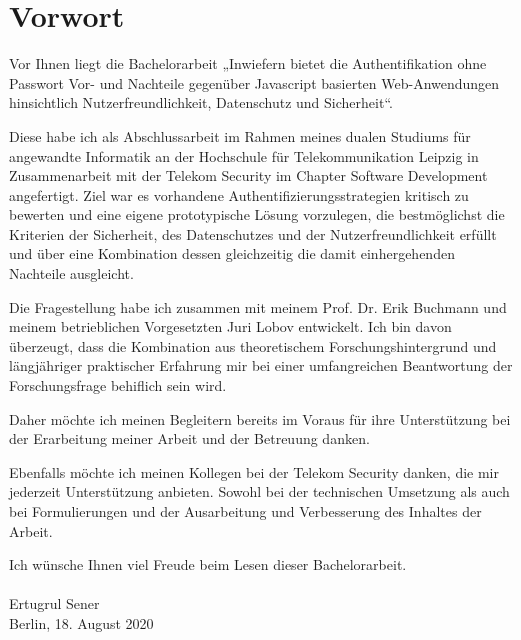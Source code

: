 \chapter{Vorwort}
Vor Ihnen liegt die Bachelorarbeit „Inwiefern bietet die Authentifikation ohne Passwort Vor- und Nachteile gegenüber Javascript basierten Web-Anwendungen hinsichtlich Nutzerfreundlichkeit, Datenschutz und Sicherheit“.

Diese habe ich als Abschlussarbeit im Rahmen meines dualen Studiums für angewandte Informatik an der Hochschule für Telekommunikation Leipzig in Zusammenarbeit mit der Telekom Security im Chapter Software Development angefertigt. Ziel war es vorhandene Authentifizierungsstrategien kritisch zu bewerten und eine eigene prototypische Lösung vorzulegen, die bestmöglichst die Kriterien der Sicherheit, des Datenschutzes und der Nutzerfreundlichkeit erfüllt und über eine Kombination dessen gleichzeitig die damit einhergehenden Nachteile ausgleicht.

Die Fragestellung habe ich zusammen mit meinem Prof. Dr. Erik Buchmann und meinem betrieblichen Vorgesetzten Juri Lobov entwickelt. Ich bin davon überzeugt, dass die Kombination aus theoretischem Forschungshintergrund und längjähriger praktischer Erfahrung mir bei einer umfangreichen Beantwortung der Forschungsfrage behiflich sein wird.

Daher möchte ich meinen Begleitern bereits im Voraus für ihre Unterstützung bei der Erarbeitung meiner Arbeit und der Betreuung danken.

Ebenfalls möchte ich meinen Kollegen bei der Telekom Security danken, die mir jederzeit Unterstützung anbieten. Sowohl bei der technischen Umsetzung als auch bei Formulierungen und der Ausarbeitung und Verbesserung des Inhaltes der Arbeit.

Ich wünsche Ihnen viel Freude beim Lesen dieser Bachelorarbeit.\\
\\
Ertugrul Sener\\
Berlin, 18. August 2020
